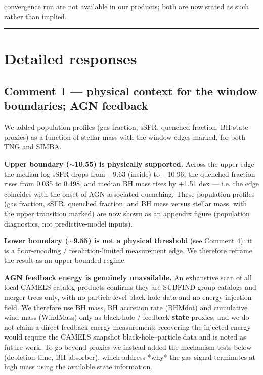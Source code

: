 \documentclass[11pt]{article}
\begin{document}
convergence run are not available in our products; both are now stated as such rather than implied.

\bigskip\hrule\bigskip
\section*{Detailed responses}
\subsection*{Comment 1 --- physical context for the window boundaries; AGN feedback}
We added population profiles (gas fraction, sSFR, quenched fraction, BH-state proxies) as a function of stellar mass with the window edges marked, for both TNG and SIMBA.

\textbf{Upper boundary ($\sim$10.55) is physically supported.} Across the upper edge the median log sSFR drops from $-$9.63 (inside) to $-$10.96, the quenched fraction rises from 0.035 to 0.498, and median BH mass rises by +1.51 dex --- i.e. the edge coincides with the onset of AGN-associated quenching. These population profiles (gas fraction, sSFR, quenched fraction, and BH mass versus stellar mass, with the upper transition marked) are now shown as an appendix figure (population diagnostics, not predictive-model inputs).

\textbf{Lower boundary ($\sim$9.55) is not a physical threshold} (see Comment 4): it is a floor-encoding / resolution-limited measurement edge. We therefore reframe the result as an upper-bounded regime.

\textbf{AGN feedback energy is genuinely unavailable.} An exhaustive scan of all local CAMELS catalog products confirms they are SUBFIND group catalogs and merger trees only, with no particle-level black-hole data and no energy-injection field. We therefore use BH mass, BH accretion rate (BHMdot) and cumulative wind mass (WindMass) only as black-hole / feedback \textbf{state} proxies, and we do not claim a direct feedback-energy measurement; recovering the injected energy would require the CAMELS snapshot black-hole--particle data and is noted as future work. To go beyond proxies we instead added the mechanism tests below (depletion time, BH absorber), which address *why* the gas signal terminates at high mass using the available state information.
\end{document}
